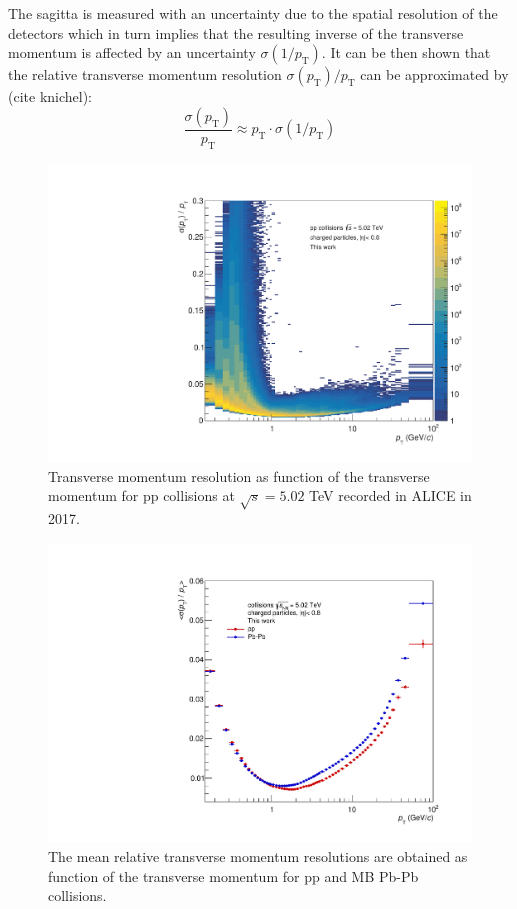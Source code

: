 \documentclass[12pt,a4paper]{report}
\begin{document}
The sagitta is measured with an uncertainty due to the spatial resolution of the detectors which in turn implies that the resulting inverse of the transverse momentum is affected by an uncertainty $\sigma(1/p_\text{T})$. It can be then shown that the relative transverse momentum resolution $\sigma(p_\text{T})/p_\text{T}$ can be approximated by (cite knichel):
\begin{equation}
\dfrac{\sigma(p_\text{T})}{p_\text{T}} \approx p_\text{T} \cdot \sigma(1/p_\text{T})
\end{equation}
\begin{figure}[tb!]
\centering
\includegraphics[width=12cm]{Plots/ptReso2D.pdf}  
\caption{Transverse momentum resolution as function of the transverse momentum for pp collisions at $\sqrt{s} = 5.02$ TeV recorded in ALICE in 2017.}
\label{ptReso2D}
\end{figure}
\begin{figure}[tb!]
\centering
\includegraphics[width=12cm]{Plots/ptReso1D.pdf}  
\caption{The mean relative transverse momentum resolutions are obtained as function of the transverse momentum for pp and MB Pb-Pb collisions.}
\label{ptReso1D}
\end{figure}
\end{document}
